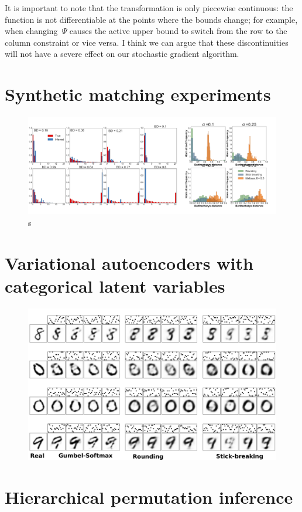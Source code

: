 \documentclass{article}
\begin{document}
It is important to note that the transformation is only piecewise
continuous: the function is not differentiable at the points where
the bounds change; for example, when changing~$\Psi$ causes the
active upper bound to switch from the row to the column constraint
or vice versa.  I think we can argue that these discontinuities
will not have a severe effect on our stochastic gradient algorithm.

\section{Synthetic matching experiments}

\begin{figure}[t]
  \centering
  \includegraphics[width=1.0\textwidth]{../figures/figure5.pdf} 
  \caption{s
  }
\label{fig:transforms}
\end{figure}

\label{sec:synthetic}

\section{Variational autoencoders with categorical latent variables}

\begin{figure}[t]
  \centering
  \includegraphics[width=5.in]{../figures/figure4.pdf} 
  \caption{
  }
\label{fig:transforms}
\end{figure}

\label{sec:vae}

\section{Hierarchical permutation inference}
\label{sec:synth_celegans}






\appendix
\end{document}
